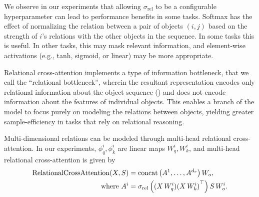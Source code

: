 We observe in our experiments that allowing $\sigma_{\mathrm{rel}}$ to be a configurable hyperparameter can lead to performance benefits in some tasks. Softmax has the effect of normalizing the relation between a pair of objects $(i,j)$ based on the strength of $i$'s relations with the other objects in the sequence. In some tasks this is useful. In other tasks, this may mask relevant information, and element-wise activations (e.g., tanh, sigmoid, or linear) may be more appropriate.

Relational cross-attention implements a type of information bottleneck, that we call the ``relational bottleneck'', wherein the resultant representation encodes only relational information about the object sequence () and does not encode information about the features of individual objects.
This enables a branch of the model to focus purely on modeling the relations between objects, yielding greater sample-efficiency in tasks that rely on relational reasoning.


Multi-dimensional relations can be modeled through multi-head relational cross-attention. In our experiments, $\phi_q^i, \phi_k^i$ are linear maps $W_q^{i}, W_k^{i}$, and multi-head relational cross-attention is given by
\begin{equation}
    \begin{split}
        \mathrm{RelationalCrossAttention}(X, S) &= \mathrm{concat}\left(A^{1}, \ldots, A^{d_r}\right) W_o, \\
        \text{where } A^i &= \sigma_{\mathrm{rel}}\left((X \, W_q^{i}) {(X \, W_k^{i})}^\top\right) S \, W_o^{i} .
    \end{split}
\end{equation}

